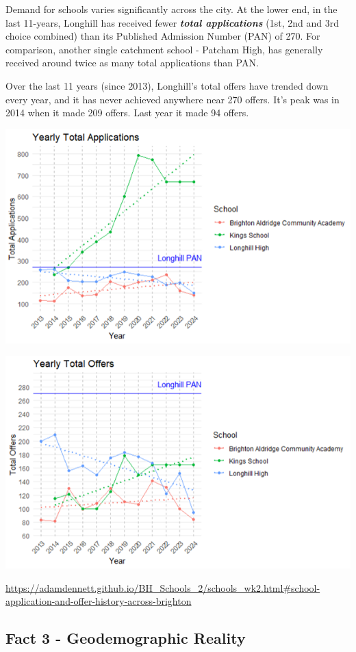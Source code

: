 \documentclass[
  letterpaper,
  DIV=11,
  numbers=noendperiod]{scrartcl}
\begin{document}
Demand for schools varies significantly across the city. At the lower
end, in the last 11-years, Longhill has received fewer
\textbf{\emph{total applications}} (1st, 2nd and 3rd choice combined)
than its Published Admission Number (PAN) of 270. For comparison,
another single catchment school - Patcham High, has generally received
around twice as many total applications than PAN.

Over the last 11 years (since 2013), Longhill's total offers have
trended down every year, and it has never achieved anywhere near 270
offers. It's peak was in 2014 when it made 209 offers. Last year it made
94 offers.

\includegraphics{images/yearly_apps_sml.png}

\includegraphics{images/yearly_offers_sml.png}

\url{https://adamdennett.github.io/BH_Schools_2/schools_wk2.html\#school-application-and-offer-history-across-brighton}

\hypertarget{fact-3---geodemographic-reality}{%
\subsection{Fact 3 - Geodemographic
Reality}\label{fact-3---geodemographic-reality}}
\end{document}
